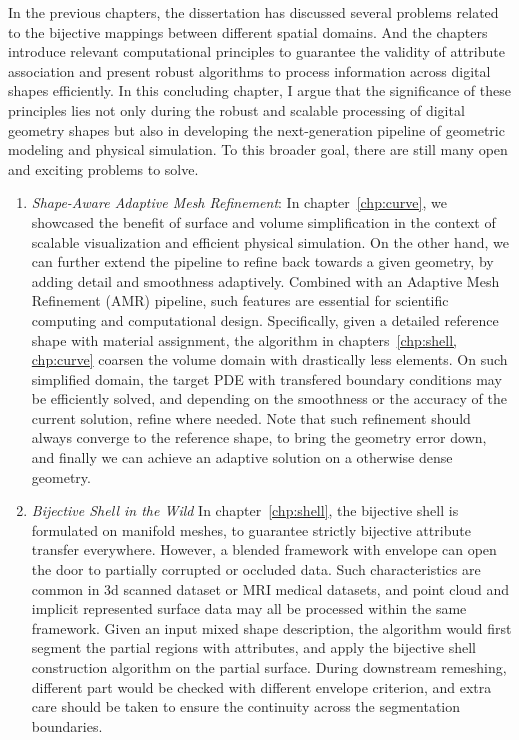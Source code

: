 In the previous chapters, the dissertation has discussed several problems related to the bijective mappings between different spatial domains.
And the chapters introduce relevant computational principles to guarantee the validity of attribute association and present robust algorithms to process information across digital shapes efficiently. 
In this concluding chapter, I argue that the significance of these principles lies not only during the robust and scalable processing of digital geometry shapes but also in developing the next-generation pipeline of geometric modeling and physical simulation. 
To this broader goal, there are still many open and exciting problems to solve.

\begin{enumerate}
  \item \emph{Shape-Aware Adaptive Mesh Refinement}:
In chapter~\ref{chp:curve}, we showcased the benefit of surface and volume simplification in the context of scalable visualization and efficient physical simulation. 
On the other hand, we can further extend the pipeline to refine back towards a given geometry, by adding detail and smoothness adaptively. Combined with an Adaptive Mesh Refinement (AMR) pipeline, such features are essential for scientific computing and computational design.
Specifically, given a detailed reference shape with material assignment, the algorithm in chapters~\ref{chp:shell, chp:curve} coarsen the volume domain with drastically less elements. 
On such simplified domain, the target PDE with transfered boundary conditions may be efficiently solved, and depending on the smoothness or the accuracy of the current solution, refine where needed. 
Note that such refinement should always converge to the reference shape, to bring the geometry error down, and finally we can achieve an adaptive solution on a otherwise dense geometry. 

\item \emph{Bijective Shell in the Wild} %
In chapter~\ref{chp:shell}, the bijective shell is formulated on manifold meshes, 
to guarantee strictly bijective attribute transfer everywhere.
However, a blended framework with envelope \cite{hu2018tetrahedral, Wang:2021} can open the door to partially corrupted or occluded data. 
Such characteristics are common in 3d scanned dataset or MRI medical datasets, and point cloud and implicit represented surface data may all be processed within the same framework.
Given an input mixed shape description, the algorithm would first segment the partial regions with attributes, and apply the bijective shell construction algorithm on the partial surface. During downstream remeshing, different part would be checked with different envelope criterion, and extra care should be taken to ensure the continuity across the segmentation boundaries. 


\end{enumerate}
